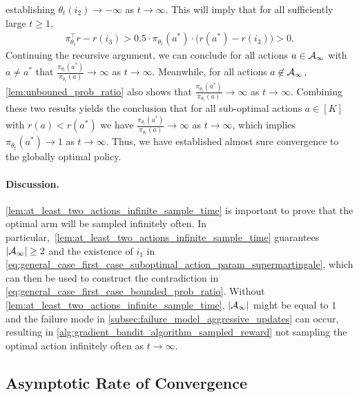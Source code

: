 establishing $\theta_t(i_2) \to -\infty$ as $t \to \infty$. 
This will imply that for all sufficiently large $t \ge 1$,
\begin{align}
\label{eq:general_case_second_case_positive_reward_difference_b}
    \pi_{\theta_t}^\top r - r(i_3) > 0.5 \cdot \pi_{\theta_t}(a^*) \cdot \big( r(a^*) - r(i_3) \big) > 0.
\end{align}
Continuing the recursive argument, we can conclude for all actions $a \in {\mathcal{A}}_\infty$ with $a \ne a^*$ that $\frac{ \pi_{\theta_t}(a^*) }{ \pi_{\theta_t}(a)} \to \infty$ as $t \to \infty$. 
Meanwhile, for all actions $a \not\in {\mathcal{A}}_\infty$, \cref{lem:unbouned_prob_ratio} also shows that
$\frac{ \pi_{\theta_t}(a^*) }{ \pi_{\theta_t}(a)} \to \infty$ as $t \to \infty$. Combining these two results yields the conclusion that for all sub-optimal actions $a \in [K]$ with $r(a) < r(a^*)$ we have $\frac{ \pi_{\theta_t}(a^*) }{ \pi_{\theta_t}(a)} \to \infty$ as $t \to \infty$, which implies $\pi_{\theta_t}(a^*) \to 1$ as $t \to \infty$. Thus, we have established almost sure convergence to the globally optimal policy.

\paragraph{Discussion.} \cref{lem:at_least_two_actions_infinite_sample_time} is important to prove that the optimal arm will be sampled infinitely often. In particular,~\cref{lem:at_least_two_actions_infinite_sample_time} guarantees $| {\mathcal{A}}_\infty | \ge 2$ and the existence of $i_1$ in \cref{eq:general_case_first_case_suboptimal_action_param_supermartingale}, which can then be used to construct the contradiction in \cref{eq:general_case_first_case_bounded_prob_ratio}. Without \cref{lem:at_least_two_actions_infinite_sample_time}, 
$| {\mathcal{A}}_\infty |$ might be equal to $1$ and the failure mode in \cref{subsec:failure_model_aggressive_updates} can occur, resulting in \cref{alg:gradient_bandit_algorithm_sampled_reward} not sampling the optimal action infinitely often as $t \to \infty$.

\subsection{Asymptotic Rate of Convergence}


